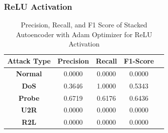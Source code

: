 \documentclass[12pt, a4paper]{report}
\begin{document}
\subsubsection{ReLU Activation}
\begin{table}[ht]
\centering
\captionsetup{justification=centering,margin=2cm}
\begin{tabular}{|c|c|c|c|c|}
\hline
\multicolumn{1}{|c|}{\textbf{Attack Type}} & \multicolumn{1}{c|}{\textbf{Precision}} & \multicolumn{1}{c|}{\textbf{Recall}} & \multicolumn{1}{c|}{\textbf{F1-Score}} \\ \hline
\textbf{Normal}        & 0.0000                                   & 0.0000                                & 0.0000                                                                   \\ \hline
\textbf{DoS}           & 0.3646                                  & 1.0000                                &  0.5343                                                                    \\ \hline
\textbf{Probe}         & 0.6719                                  & 0.6176                                & 0.6436                                                                  \\ \hline
\textbf{U2R}           & 0.0000                                    & 0.0000                                & 0.0000                                                                   \\ \hline
\textbf{R2L}           & 0.0000                                      & 0.0000                                   & 0.0000                                                            \\ \hline         \end{tabular}
\caption{Precision, Recall, and F1 Score of Stacked Autoencoder with Adam Optimizer for ReLU Activation}
\label{prf1_adam_relu_auto}
\end{table}
\clearpage
\end{document}
